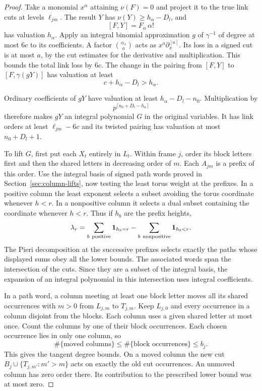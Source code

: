 \begin{proof}
Take a monomial \(x^\alpha\) attaining \(\nu(F)=0\) and
project it to the true link cuts at levels \(\ell_{jm}\).
The result \(Y\) has \(\nu(Y)\ge h_\alpha-D_l\), and
\[
 [F,Y]=F_\alpha\,\alpha!
\]
has valuation \(h_\alpha\).
Apply an integral binomial approximation \(g\) of \(\gamma^{-1}\)
of degree at most \(6c\) to its coefficients. A factor
\(\binom{\alpha_x}{a}\) acts as
\(x^a\partial_x^{[a]}\). Its loss in a signed cut is at
most \(a\), by the cut estimates for the derivative and
multiplication. This bounds the total link loss by \(6c\).
The change in the pairing from \([F,Y]\) to
\([F,\gamma(gY)]\) has valuation at least
\[
 c+h_\alpha-D_l>h_\alpha.
\]

Ordinary coefficients of \(gY\) have valuation at least
\(h_\alpha-D_l-n_0\). Multiplication by
\[
 p^{\lceil n_0+D_l-h_\alpha\rceil}
\]
therefore makes \(gY\)
an integral polynomial \(G\) in the original variables. It has link orders at least
\(\ell_{jm}-6c\) and its twisted pairing has valuation at
most \(n_0+D_l+1\).

To lift \(G\), first put each \(X_t\) entirely in \(L_t\).
Within frame \(j\), order its block letters first and then
the shared letters in decreasing order of \(m\). Each
\(A_{jm}\) is a prefix of this order. Use the integral basis
of signed path words proved in Section~\ref{sec:column-lifts},
now testing the least torus weight at the prefixes.
In a positive column the least exponent selects a
subset avoiding the torus coordinate whenever \(h<r\).
In a nonpositive column it selects a dual subset
containing the coordinate whenever \(h<r\). Thus if
\(h_b\) are the prefix heights,
\[
 \lambda_r=
 \sum_{b\ {\rm positive}}\mathbf1_{h_b=r}
       -\sum_{b\ {\rm nonpositive}}\mathbf1_{h_b<r}.
\]
The Pieri decomposition at the successive prefixes
selects exactly the paths whose displayed sums obey all
the lower bounds. The associated words span the
intersection of the cuts. Since they are a
subset of the integral basis, the expansion of an integral
polynomial in this intersection uses integral coefficients.

In a path word, a column meeting at least one block
letter moves all its shared occurrences with \(m>0\) from
\(L_{j,m}\) to \(T_{j,m}\). Keep \(L_{j,0}\) and every
occurrence in a column disjoint from the blocks. Each
column uses a given shared letter at most once. Count the columns by one of their block occurrences. Each chosen occurrence lies in only one column, so
\[
 \#\{\text{moved columns}\}\le\#\{\text{block occurrences}\}\le b_j.
\]
This gives the tangent degree bounds.
On a moved column the new cut \(B_j\cup\{T_{j,m'}:m'>m\}\)
acts on exactly the old cut occurrences. An unmoved
column has zero order there. Its contribution to the
prescribed lower bound was at most zero.


\end{proof}
